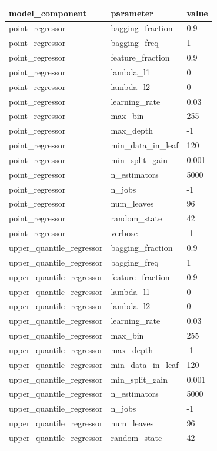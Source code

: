 \begin{tabular}{lll}
\toprule
model\_component & parameter & value \\
\midrule
point\_regressor & bagging\_fraction & 0.9 \\
point\_regressor & bagging\_freq & 1 \\
point\_regressor & feature\_fraction & 0.9 \\
point\_regressor & lambda\_l1 & 0 \\
point\_regressor & lambda\_l2 & 0 \\
point\_regressor & learning\_rate & 0.03 \\
point\_regressor & max\_bin & 255 \\
point\_regressor & max\_depth & -1 \\
point\_regressor & min\_data\_in\_leaf & 120 \\
point\_regressor & min\_split\_gain & 0.001 \\
point\_regressor & n\_estimators & 5000 \\
point\_regressor & n\_jobs & -1 \\
point\_regressor & num\_leaves & 96 \\
point\_regressor & random\_state & 42 \\
point\_regressor & verbose & -1 \\
upper\_quantile\_regressor & bagging\_fraction & 0.9 \\
upper\_quantile\_regressor & bagging\_freq & 1 \\
upper\_quantile\_regressor & feature\_fraction & 0.9 \\
upper\_quantile\_regressor & lambda\_l1 & 0 \\
upper\_quantile\_regressor & lambda\_l2 & 0 \\
upper\_quantile\_regressor & learning\_rate & 0.03 \\
upper\_quantile\_regressor & max\_bin & 255 \\
upper\_quantile\_regressor & max\_depth & -1 \\
upper\_quantile\_regressor & min\_data\_in\_leaf & 120 \\
upper\_quantile\_regressor & min\_split\_gain & 0.001 \\
upper\_quantile\_regressor & n\_estimators & 5000 \\
upper\_quantile\_regressor & n\_jobs & -1 \\
upper\_quantile\_regressor & num\_leaves & 96 \\
upper\_quantile\_regressor & random\_state & 42 \\

\end{tabular}
